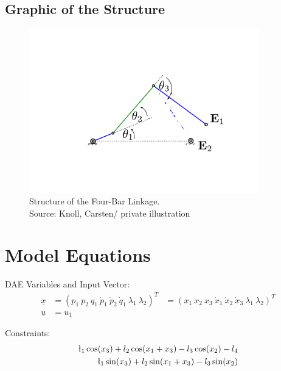 \documentclass[10pt,a4paper]{article}
\begin{document}
	 \subsection{Graphic of the Structure}
	\begin{figure}[H]
		\centering
		\captionsetup{justification=centering, margin=1cm}
		\includegraphics[width=100mm]{viergelenk.pdf}
		\caption{Structure of the Four-Bar Linkage. \\ \footnotesize{Source: Knoll, Carsten/ private illustration}}
	\end{figure}



	\section{Model Equations} %

	DAE Variables and Input Vector:
	\begin{align*}
		\underline{x} &= (p_1 \ p_2 \ q_1 \ \dot{p}_1 \ \dot{p}_2 \ \dot{q}_1 \ \lambda_1 \ \lambda_2)^T &= (x_1 \ x_2 \ x_3 \ \dot{x}_1 \ \dot{x}_2 \ \dot{x}_3 \ \lambda_1 \ \lambda_2)^T \\
		\underline{u} &= u_1
	\end{align*}

	\noindent Constraints:
	\begin{subequations}
	\begin{align}
		\l_1\cos(x_3) + l_2\cos(x_1 + x_3) - l_3\cos(x_2) - l_4 \\
		\l_1\sin(x_3) + l_2\sin(x_1 + x_3) - l_3\sin(x_2)
	\end{align}
	\end{subequations}
\end{document}
